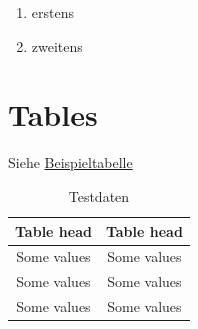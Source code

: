 \documentclass[12pt]{scrartcl}
\begin{document}
\begin{enumerate}
	\item erstens
	\item zweitens
\end{enumerate}


\section{Tables}

	Siehe \hyperref[tab:test]{Beispieltabelle}

	\begin{table}
	\centering
	\begin{tabular}{c|c}

		\rowcolor{gray!15}
	    Table head & Table head \\\hline

	    Some values & Some values \\\hline
    
	    Some values & Some values \\\hline
	    
	    Some values & Some values
	    

	\end{tabular}
	\caption{Testdaten}
	\label{tab:test}
	\end{table}
\end{document}
